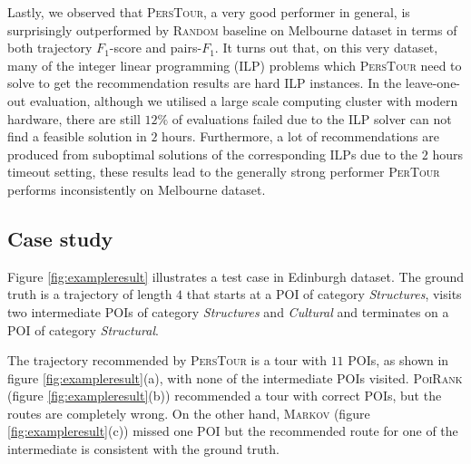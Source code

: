 Lastly, we observed that \textsc{PersTour}, a very good performer in general, is surprisingly outperformed by \textsc{Random} baseline
on Melbourne dataset in terms of both trajectory $F_1$-score and pairs-$F_1$.
It turns out that, on this very dataset, many of the integer linear programming (ILP) problems
which \textsc{PersTour} need to solve to get the recommendation results are hard ILP instances.
In the leave-one-out evaluation, although we utilised a large scale computing cluster with modern hardware,
there are still $12\%$ of evaluations failed due to the ILP solver can not find a feasible solution in $2$ hours.
Furthermore, a lot of recommendations are produced from suboptimal solutions of the corresponding ILPs due to
the $2$ hours timeout setting, these results lead to the generally strong performer \textsc{PerTour} performs
inconsistently on Melbourne dataset.


\subsection{Case study}
\label{sec:casestudy}


Figure \ref{fig:exampleresult} illustrates a test case in Edinburgh dataset.
The ground truth is a trajectory of length $4$ that starts at a POI of category \textit{Structures},
visits two intermediate POIs of category \textit{Structures} and \textit{Cultural} and 
terminates on a POI of category \textit{Structural}.

The trajectory recommended by \textsc{PersTour} is a tour with $11$ POIs, as shown in figure \ref{fig:exampleresult}(a),
with none of the intermediate POIs visited.
\textsc{PoiRank} (figure \ref{fig:exampleresult}(b)) recommended a tour with correct POIs, but the routes are completely wrong.
On the other hand, \textsc{Markov} (figure \ref{fig:exampleresult}(c)) missed one POI but the recommended route for one of 
the intermediate is consistent with the ground truth.

